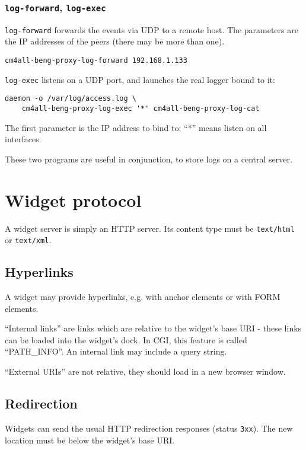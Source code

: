 \documentclass[a4paper,12pt]{article}
\begin{document}
\subsubsection{\texttt{log-forward}, \texttt{log-exec}}

\texttt{log-forward} forwards the events via UDP to a remote host.
The parameters are the IP addresses of the peers (there may be more
than one).

\begin{verbatim}
cm4all-beng-proxy-log-forward 192.168.1.133
\end{verbatim}

\texttt{log-exec} listens on a UDP port, and launches the real logger
bound to it:

\begin{verbatim}
daemon -o /var/log/access.log \
    cm4all-beng-proxy-log-exec '*' cm4all-beng-proxy-log-cat
\end{verbatim}

The first parameter is the IP address to bind to; ``*'' means listen
on all interfaces.

These two programs are useful in conjunction, to store logs on a
central server.


\section{Widget protocol}

A widget server is simply an HTTP server.  Its content type must be
\texttt{text/html} or \texttt{text/xml}.


\subsection{Hyperlinks}

A widget may provide hyperlinks, e.g. with anchor elements or with
FORM elements.

``Internal links'' are links which are relative to the widget's base
URI - these links can be loaded into the widget's dock.  In CGI, this
feature is called ``PATH\_INFO''.  An internal link may include a
query string.

``External URIs'' are not relative, they should
load in a new browser window.

\subsection{Redirection}

Widgets can send the usual HTTP redirection responses (status
\texttt{3xx}).  The new location must be below the widget's base URI.
\end{document}
